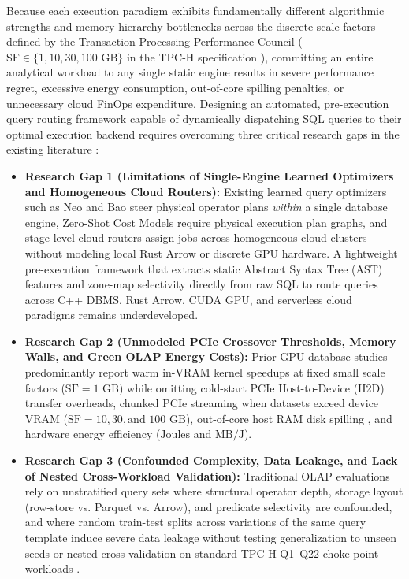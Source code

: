 \documentclass[10pt,a4paper]{article}
\begin{document}
Because each execution paradigm exhibits fundamentally different algorithmic strengths and memory-hierarchy bottlenecks across the discrete scale factors defined by the Transaction Processing Performance Council ($\text{SF} \in \{1, 10, 30, 100\text{ GB}\}$ in the TPC-H specification \cite{tpc2022tpch,boncz2014tpch,dreseler2020quantifying}), committing an entire analytical workload to any single static engine results in severe performance regret, excessive energy consumption, out-of-core spilling penalties, or unnecessary cloud FinOps expenditure. Designing an automated, pre-execution query routing framework capable of dynamically dispatching SQL queries to their optimal execution backend requires overcoming three critical research gaps in the existing literature \cite{ahmed2020hibench,oneil2009ssb,leis2015job}:
\begin{itemize}[leftmargin=1.5em,itemsep=2pt]
    \item \textbf{Research Gap 1 (Limitations of Single-Engine Learned Optimizers and Homogeneous Cloud Routers):} Existing learned query optimizers such as Neo \cite{marcus2019neo} and Bao \cite{marcus2021bao} steer physical operator plans \emph{within} a single database engine, Zero-Shot Cost Models \cite{hilprecht2022zeroshot} require physical execution plan graphs, and stage-level cloud routers \cite{tan2023stage} assign jobs across homogeneous cloud clusters without modeling local Rust Arrow or discrete GPU hardware. A lightweight pre-execution framework that extracts static Abstract Syntax Tree (AST) features and zone-map selectivity directly from raw SQL to route queries across C++ DBMS, Rust Arrow, CUDA GPU, and serverless cloud paradigms remains underdeveloped.
    \item \textbf{Research Gap 2 (Unmodeled PCIe Crossover Thresholds, Memory Walls, and Green OLAP Energy Costs):} Prior GPU database studies \cite{shanbhag2020crystal,root2019mapd,kim2022blazingsql} predominantly report warm in-VRAM kernel speedups at fixed small scale factors ($\text{SF}=1\text{ GB}$) while omitting cold-start PCIe Host-to-Device (H2D) transfer overheads, chunked PCIe streaming when datasets exceed device VRAM ($\text{SF}=10, 30, \text{and } 100\text{ GB}$), out-of-core host RAM disk spilling \cite{kuiper2024duckdb_ooc}, and hardware energy efficiency ($\text{Joules}$ and $\text{MB/J}$).
    \item \textbf{Research Gap 3 (Confounded Complexity, Data Leakage, and Lack of Nested Cross-Workload Validation):} Traditional OLAP evaluations \cite{ahmed2020hibench,abdalla2022bigdata} rely on unstratified query sets where structural operator depth, storage layout (row-store vs. Parquet vs. Arrow), and predicate selectivity are confounded, and where random train-test splits across variations of the same query template induce severe data leakage without testing generalization to unseen seeds or nested cross-validation on standard TPC-H Q1--Q22 choke-point workloads \cite{boncz2014tpch,dreseler2020quantifying}.
\end{itemize}
\end{document}
